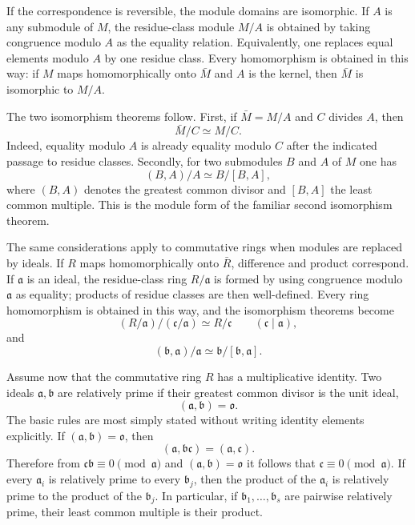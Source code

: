 \documentclass[12pt]{article}
\begin{document}
If the correspondence is reversible, the module domains are isomorphic. If $A$ is any submodule of $M$, the residue-class module $M/A$ is obtained by taking congruence modulo $A$ as the equality relation. Equivalently, one replaces equal elements modulo $A$ by one residue class. Every homomorphism is obtained in this way: if $M$ maps homomorphically onto $\bar M$ and $A$ is the kernel, then $\bar M$ is isomorphic to $M/A$.

The two isomorphism theorems follow. First, if $\bar M=M/A$ and $C$ divides $A$, then
\[
  \bar M/C \simeq M/C.
\]
Indeed, equality modulo $A$ is already equality modulo $C$ after the indicated passage to residue classes. Secondly, for two submodules $B$ and $A$ of $M$ one has
\[
  (B,A)/A \simeq B/[B,A],
\]
where $(B,A)$ denotes the greatest common divisor and $[B,A]$ the least common multiple. This is the module form of the familiar second isomorphism theorem.

The same considerations apply to commutative rings when modules are replaced by ideals. If $R$ maps homomorphically onto $\bar R$, difference and product correspond. If $\mathfrak a$ is an ideal, the residue-class ring $R/\mathfrak a$ is formed by using congruence modulo $\mathfrak a$ as equality; products of residue classes are then well-defined. Every ring homomorphism is obtained in this way, and the isomorphism theorems become
\[
  (R/\mathfrak a)/(\mathfrak c/\mathfrak a)\simeq R/\mathfrak c
  \qquad (\mathfrak c\mid \mathfrak a),
\]
and
\[
  (\mathfrak b,\mathfrak a)/\mathfrak a\simeq \mathfrak b/[\mathfrak b,\mathfrak a].
\]

Assume now that the commutative ring $R$ has a multiplicative identity. Two ideals $\mathfrak a,\mathfrak b$ are relatively prime if their greatest common divisor is the unit ideal,
\[
  (\mathfrak a,\mathfrak b)=\mathfrak o.
\]
The basic rules are most simply stated without writing identity elements explicitly. If $(\mathfrak a,\mathfrak b)=\mathfrak o$, then
\[
  (\mathfrak a,\mathfrak b\mathfrak c)=(\mathfrak a,\mathfrak c).
\]
Therefore from $\mathfrak c\mathfrak b\equiv0\pmod{\mathfrak a}$ and $(\mathfrak a,\mathfrak b)=\mathfrak o$ it follows that $\mathfrak c\equiv0\pmod{\mathfrak a}$. If every $\mathfrak a_i$ is relatively prime to every $\mathfrak b_j$, then the product of the $\mathfrak a_i$ is relatively prime to the product of the $\mathfrak b_j$. In particular, if $\mathfrak b_1,\ldots,\mathfrak b_s$ are pairwise relatively prime, their least common multiple is their product.
\end{document}
